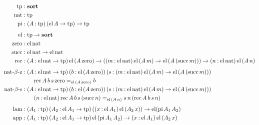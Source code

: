 \documentclass[11pt,twoside]{article}
\newcommand{\parens}[1]{(#1)}
\newcommand{\sortclass}{\ensuremath{\textbf{sort}}}
\newcommand{\eqclass}[3]{{#2}=_{#1}{#3}}
\newcommand{\piclass}[3]{({#2}\mathbin{:}{#1})\,{#3}}
\newcommand{\arrclass}[2]{{#1}\to{#2}}
\newcommand{\appobj}[2]{{#1}\,{#2}}
\begin{document}
\begin{figure}
  
  \begin{align*}
    \tpsort
    & : \sortclass \\
    \nattp
    & : \tpsort \\
    \pitp
    & : \piclass{\tpsort}{A}{\arrclass{\parens{\arrclass{\elof{A}}{\tpsort}}}{\tpsort}} \\[1ex]
%
    \elfam 
    & : \arrclass{\tpsort}{\sortclass} \\
    \zerocon
    & : \elof{\nattp} \\
    \succcon
    & : \arrclass {\elof{\nattp}}{\elof{\nattp}} \\
    \reccon
    &  :
      \piclass{\arrclass{\elof{\nattp}}{\tpsort}}{A}{
      \arrclass{\elofp{\appobj{A}{\zerocon}}}{
      \arrclass{\parens{
      \piclass{\elof{\nattp}}{m}{
        \arrclass{\elofp{\appobj{A}{m}}}{\elofp{\appobj{A}{\parens{\succof{m}}}}}}}}
      {\piclass{\elof{\nattp}}{n}{\elofp{\appobj{A}{n}}}}}} \\[1ex] 
%
    \reczcon
    & :
      \piclass{\arrclass{\elof{\nattp}}{\tpsort}}{A}{
      \piclass{\elofp{\appobj{A}{\zerocon}}}{b}{
      \piclass{\piclass{\elof{\nattp}}{m}{\arrclass{\elofp{\appobj{A}{m}}}{\elofp{\appobj{A}{\parens{\succof{m}}}}}}}{s}{
      }}} \\
    & \qquad
      \eqclass{\elofp{\appobj{A}{\zerocon}}}{\recof{A}{b}{s}{\zerocon}}{b} \\
%
    \recscon
    & :
      \piclass{\arrclass{\elof{\nattp}}{\tpsort}}{A}{
      \piclass{\elofp{\appobj{A}{\zerocon}}}{b}{
      \piclass{\piclass{\elof{\nattp}}{m}{\arrclass{\elofp{\appobj{A}{m}}}{\elofp{\appobj{A}{\parens{\succof{m}}}}}}}{s}{
      }}} \\
    & \qquad
      \piclass{\elof{\nattp}}{n}{
      \eqclass{\elofp{\appobj{A}{n}}}
      {\recof{A}{b}{s}{\parens{\succof{n}}}}
      {\appobj{\appobj{s}{n}}{\parens{\recof{A}{b}{s}{n}}}}} \\[1ex]
%
    \lamcon
    & :
      \piclass{\tpsort}{A_{1}}{
      \piclass{\arrclass{\elof{A_{1}}}{\tpsort}}{A_{2}}{
      \arrclass{\parens{\piclass{\elof{A_{1}}}{x}{\elofp{\appobj{A_{2}}{x}}}}}{
      \elfam{\parens{\piof{A_{1}}{A_{2}}}}}}} \\
    \appcon
    & :
      \piclass{\tpsort}{A_{1}}{
      \piclass{\arrclass{\elof{A_{1}}}{\tpsort}}{A_{2}}{
      \arrclass{\elofp{\piof{A_{1}}{A_{2}}}}{
      \piclass{\elof{A_{1}}}{x}{\elofp{\appobj{A_{2}}{x}}}}}} \\[1ex]

\end{align*}
\end{figure}
\end{document}
